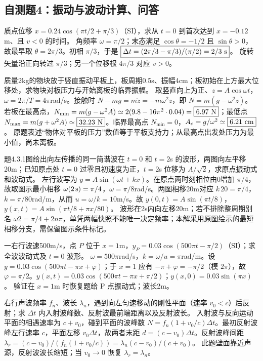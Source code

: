\subsection{自测题4：振动与波动计算、问答}

\problemtext 质点位移 $x=0.24\cos(\pi t/2+\pi/3)$（SI），求从 $t=0$ 到首次达到 $x=-0.12$m、且 $v<0$ 的时间。
\workings 角频率 $\omega=\pi/2$；末态满足 $\cos\theta=-1/2$ 且 $\sin\theta>0$，故最早取 $\theta=2\pi/3$。初相 $\pi/3$，于是 $\boxed{\Delta t=(2\pi/3-\pi/3)/(\pi/2)=2/3\ {\rm s}}$。
\crosscheck 旋转矢量沿正向转过 $\pi/3$；另一个位移根 $4\pi/3$ 对应 $v>0$。

\problemtext 质量2kg的物块放于竖直振动平板上，板周期0.5s、振幅4cm；板初始在上方最大位移处，求物块对板压力与开始离板的临界振幅。
\workings 取竖直向上为正、$z=A\cos\omega t$，$\omega=2\pi/T=4\pi$rad/s。接触时 $N-mg=m\ddot z=-m\omega^2 z$，即 $N=m(g-\omega^2 z)$。若板在最高点，$N_{\min}=m(g-\omega^2A)\simeq2(9.8-16\pi^2\cdot0.04)=\boxed{6.97\ {\rm N}}$；最低点 $N_{\max}=m(g+\omega^2A)\simeq\boxed{32.23\ {\rm N}}$。临界最高点 $N_{\min}=0$，$A_c=g/\omega^2\simeq\boxed{6.21\ {\rm cm}}$。
\crosscheck 原题表述“物体对平板的压力”数值等于平板支持力；从最高点出发处压力为最小值，尚未离板。

\problemtext 题4.3.1图给出向左传播的同一简谐波在 $t=0$ 和 $t=2$s 的波形，两图向左平移20m；已知原点处 $t=0$ 过零且初速度为正，$t=2$s 位移为 $A/\sqrt2$，求原点振动式和波动式。
\workings 左行波写为 $y=A\sin(\omega t+kx)$。在原点两时刻相位由0增加 $\pi/4$，故取图示最小相移 $\omega(2\,{\rm s})=\pi/4$，$\omega=\pi/8$rad/s。两图相移20m对应 $k\,20=\pi/4$，$k=\pi/80$rad/m，从而 $u=\omega/k=10$m/s。故 $\boxed{y(0,t)=A\sin(\pi t/8)}$，$\boxed{y(x,t)=A\sin(\pi t/8+\pi x/80)}$。
\crosscheck 波形在2s内向左移20m；若不排除整周期别名 $\omega 2=\pi/4+2n\pi$，单凭两幅快照不能唯一决定频率；本解采用原图绘示的最短相移分支，需保留图示条件标记。

\problemtext 一右行波速500m/s，点 $P$ 位于 $x=1$m，$y_P=0.03\cos(500\pi t-\pi/2)$（SI）；求全波波动式及 $t=0$ 波形。
\workings $\omega=500\pi$rad/s，$k=\omega/u=\pi$rad/m。设 $y=0.03\cos(500\pi t-\pi x+\varphi)$；于 $x=1$ 应有 $-\pi+\varphi=-\pi/2$（模 $2\pi$），故 $\varphi=\pi/2$。$\boxed{y(x,t)=0.03\cos(500\pi t-\pi x+\pi/2)}$；$\boxed{y(x,0)=0.03\sin(\pi x)}$。
\crosscheck 验证在 $x=1$m 时恢复题给 P 点振动式；波长2m。

\problemtext 右行声波频率 $f_n$、波长 $\lambda_n$，遇到向左匀速移动的刚性平面（速率 $v_0<c$）后反射；求 $\Delta t$ 内入射波峰数、反射波最前端距离以及反射波长。
\workings 入射波与反向运动平面的相遇速率为 $c+v_0$，碰到平面的波峰数 $\boxed{N=f_n(1+v_0/c)\Delta t}$。最初反射波峰左行速率 $c$，平面左移 $v_0\Delta t$，故两者末距 $\boxed{d=(c-v_0)\Delta t}$。反射波峰间距 $\lambda_r=(c-v_0)/(f_n(1+v_0/c))=\boxed{\lambda_n(c-v_0)/(c+v_0)}$。
\crosscheck 此题壁面靠近声源，反射波波长缩短；当 $v_0\to0$ 恢复 $\lambda_r=\lambda_n$。

